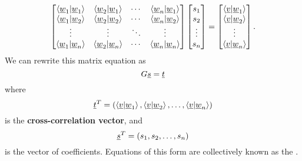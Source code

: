 \begin{equation*}
\begin{bmatrix}
\left\langle \underline{w}_1 | \underline{w}_1 \right\rangle
& \left\langle \underline{w}_2 | \underline{w}_1 \right\rangle & \cdots
& \left\langle \underline{w}_n | \underline{w}_1 \right\rangle \\
\left\langle \underline{w}_1 | \underline{w}_2 \right\rangle
& \left\langle \underline{w}_2 | \underline{w}_2 \right\rangle & \cdots
& \left\langle \underline{w}_n | \underline{w}_2 \right\rangle \\
\vdots & \vdots & \ddots & \vdots \\
\left\langle \underline{w}_1 | \underline{w}_n \right\rangle
& \left\langle \underline{w}_2 | \underline{w}_n \right\rangle & \cdots
& \left\langle \underline{w}_n | \underline{w}_n \right\rangle
\end{bmatrix}
\begin{bmatrix} s_1 \\ s_2 \\ \vdots \\ s_n \end{bmatrix}
= \begin{bmatrix} \left\langle \underline{v} | \underline{w}_1 \right\rangle \\
\left\langle \underline{v} | \underline{w}_2 \right\rangle \\ \vdots \\
\left\langle \underline{v} | \underline{w}_n \right\rangle \end{bmatrix} .
\end{equation*}
We can rewrite this matrix equation as
\begin{equation*}
G \underline{s} = \underline{t}
\end{equation*}
where
\begin{equation*}
\underline{t}^T = 
\left(
\left\langle \underline{v} | \underline{w}_1 \right\rangle,
\left\langle \underline{v} | \underline{w}_2 \right\rangle, \ldots,
\left\langle \underline{v} | \underline{w}_n \right\rangle \right)
\end{equation*}
is the \textbf{cross-correlation vector}, and
\begin{equation*}
\underline{s}^T = 
\left( s_1, s_2, \ldots, s_n \right)
\end{equation*}
is the vector of coefficients.
Equations of this form are collectively known as the .

